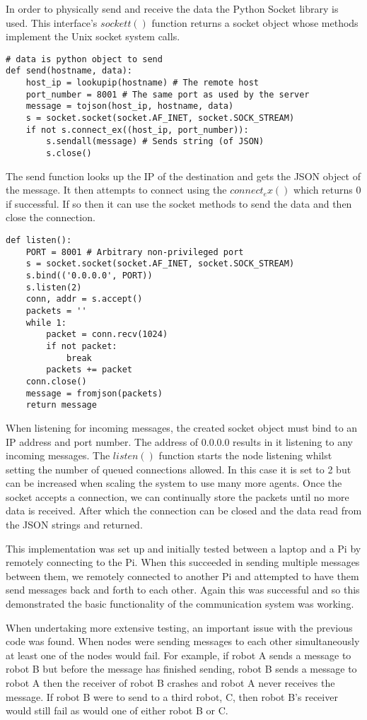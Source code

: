 In order to physically send and receive the data the Python Socket library
is used. This interface's $sockett()$ function returns a socket object whose
methods implement the Unix socket system calls.
\begin{lstlisting}
# data is python object to send
def send(hostname, data):
    host_ip = lookupip(hostname) # The remote host
    port_number = 8001 # The same port as used by the server
    message = tojson(host_ip, hostname, data)
    s = socket.socket(socket.AF_INET, socket.SOCK_STREAM)
    if not s.connect_ex((host_ip, port_number)):
        s.sendall(message) # Sends string (of JSON)
        s.close()
\end{lstlisting}
The send function looks up the IP of the destination and gets the JSON object
of the message. It then attempts to connect using the $connect_ex()$ which
returns 0 if successful. If so then it can use the socket methods to send the
data and then close the connection.

\begin{lstlisting}
def listen():
    PORT = 8001 # Arbitrary non-privileged port
    s = socket.socket(socket.AF_INET, socket.SOCK_STREAM)
    s.bind(('0.0.0.0', PORT))
    s.listen(2)
    conn, addr = s.accept()
    packets = ''
    while 1:
        packet = conn.recv(1024)
        if not packet:
            break
        packets += packet
    conn.close()
    message = fromjson(packets)
    return message
\end{lstlisting}
When listening for incoming messages, the created socket object must bind to
an IP address and port number. The address of 0.0.0.0 results in it listening
to any incoming messages. The $listen()$ function starts the node listening
whilst setting the number of queued connections allowed. In this case it is
set to 2 but can be increased when scaling the system to use many more agents.
Once the socket  accepts a connection, we can continually store the packets
until no more data is received. After which the connection can be closed and
the data read from the JSON strings and returned.

This implementation was set up and initially tested between a laptop and a Pi
by remotely connecting to the Pi. When this succeeded in sending multiple
messages between them, we remotely connected to another Pi and attempted to
have them send messages back and forth to each other. Again this was successful
and so this demonstrated the basic functionality of the communication system was
working.

When undertaking more extensive testing, an important issue with the previous
code was found. When nodes were sending messages to each other simultaneously
at least one of the nodes would fail. For example, if robot A sends a message to
robot B but before the message has finished sending, robot B sends a message to
robot A then the receiver of robot B crashes and robot A never receives the message.
If robot B were to send to a third robot, C, then robot B's receiver would still
fail as would one of either robot B or C.

